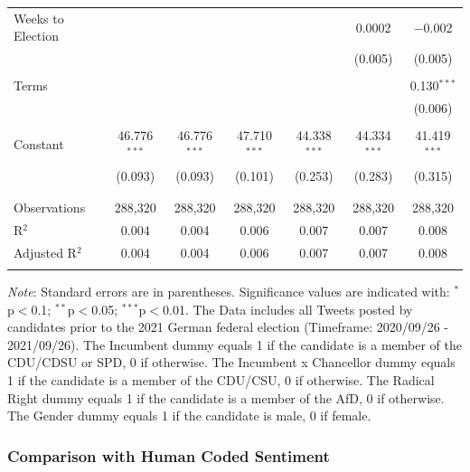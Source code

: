\documentclass[a4paper,11pt]{article}
\begin{document}
\begin{table}[H]
\begin{tabular}{@{\extracolsep{5pt}}lcccccc}
 Weeks to Election &  &  &  &  & 0.0002 & $-$0.002 \\ 
  &  &  &  &  & (0.005) & (0.005) \\ 
  & & & & & & \\ 
 Terms &  &  &  &  &  & 0.130$^{***}$ \\ 
  &  &  &  &  &  & (0.006) \\ 
  & & & & & & \\ 
 Constant & 46.776$^{***}$ & 46.776$^{***}$ & 47.710$^{***}$ & 44.338$^{***}$ & 44.334$^{***}$ & 41.419$^{***}$ \\ 
  & (0.093) & (0.093) & (0.101) & (0.253) & (0.283) & (0.315) \\ 
  & & & & & & \\ 
\hline \\[-1.8ex] 
Observations & 288,320 & 288,320 & 288,320 & 288,320 & 288,320 & 288,320 \\ 
R$^{2}$ & 0.004 & 0.004 & 0.006 & 0.007 & 0.007 & 0.008 \\ 
Adjusted R$^{2}$ & 0.004 & 0.004 & 0.006 & 0.007 & 0.007 & 0.008 \\ 
\hline 
\hline \\[-1.8ex] 
\end{tabular} 
\endgroup 
\vspace{0.5em} %
    \begin{minipage}{0.95\linewidth}
    \scriptsize
    \textit{Note}: Standard errors are in parentheses. Significance values are indicated with: $^*$p$<$0.1; $^{**}$p$<$0.05;
    $^{***}$p$<$0.01. The Data includes all Tweets posted by candidates prior to the 2021 German federal election (Timeframe:
    2020/09/26 - 2021/09/26). The Incumbent dummy equals 1 if the candidate is a member of the CDU/CDSU or SPD, 0 if otherwise. The
    Incumbent x Chancellor dummy equals 1 if the candidate is a member of the CDU/CSU, 0 if otherwise. The Radical Right dummy equals 1 if
    the candidate is a member of the AfD, 0 if otherwise. The Gender dummy equals 1 if the candidate is male, 0 if female. 
    \end{minipage}
    \end{table}
\hypertarget{comparison-with-human-coded-sentiment}{%
\subsubsection{Comparison with Human Coded Sentiment}\label{comparison-with-human-coded-sentiment}}
\end{document}
